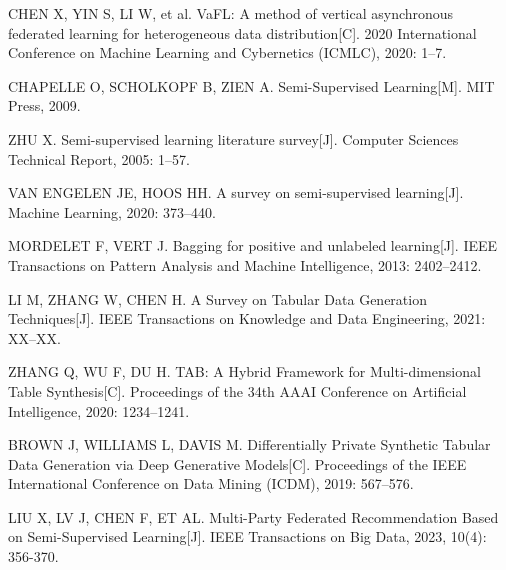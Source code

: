 \begin{thebibliography}{200}
	CHEN X, YIN S, LI W, et al. VaFL: A method of vertical asynchronous federated learning for heterogeneous data distribution[C]. 2020 International Conference on Machine Learning and Cybernetics (ICMLC), 2020: 1--7.
	
	CHAPELLE O, SCHOLKOPF B, ZIEN A. Semi-Supervised Learning[M]. MIT Press, 2009.
	
	ZHU X. Semi-supervised learning literature survey[J]. Computer Sciences Technical Report, 2005: 1--57.
	
	VAN ENGELEN JE, HOOS HH. A survey on semi-supervised learning[J]. Machine Learning, 2020: 373--440.
	
	MORDELET F, VERT J. Bagging for positive and unlabeled learning[J]. IEEE Transactions on Pattern Analysis and Machine Intelligence, 2013: 2402--2412.
	
	LI M, ZHANG W, CHEN H. A Survey on Tabular Data Generation Techniques[J]. IEEE Transactions on Knowledge and Data Engineering, 2021: XX--XX.
	
	ZHANG Q, WU F, DU H. TAB: A Hybrid Framework for Multi-dimensional Table Synthesis[C]. Proceedings of the 34th AAAI Conference on Artificial Intelligence, 2020: 1234--1241.
	
	BROWN J, WILLIAMS L, DAVIS M. Differentially Private Synthetic Tabular Data Generation via Deep Generative Models[C]. Proceedings of the IEEE International Conference on Data Mining (ICDM), 2019: 567--576.
	
	LIU X, LV J, CHEN F, ET AL. Multi-Party Federated Recommendation Based on Semi-Supervised Learning[J]. IEEE Transactions on Big Data, 2023, 10(4): 356-370.
	
	
	
	
\end{thebibliography}

\clearpage


